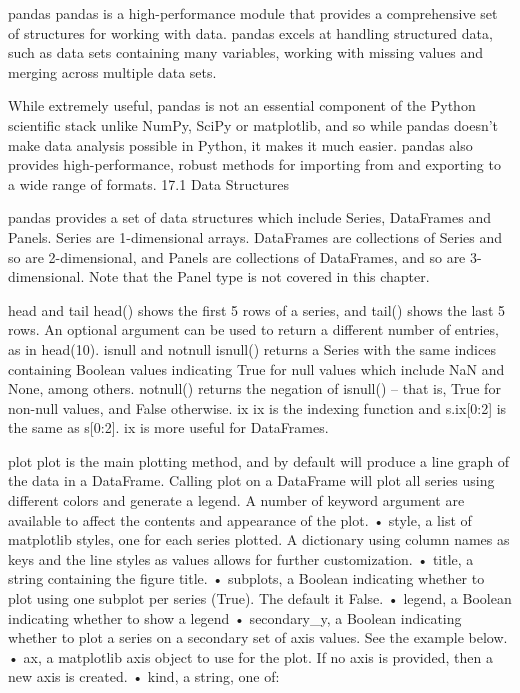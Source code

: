pandas
pandas is a high-performance module that provides a comprehensive set of structures for working with
data. pandas excels at handling structured data, such as data sets containing many variables, working with
missing values and merging across multiple data sets. 

While extremely useful, pandas is not an essential component of the Python scientific stack unlike NumPy, SciPy or matplotlib, and so while pandas doesn’t
make data analysis possible in Python, it makes it much easier. pandas also provides high-performance,
robust methods for importing from and exporting to a wide range of formats.
17.1 Data Structures

pandas provides a set of data structures which include Series, DataFrames and Panels. Series are 1-dimensional
arrays. DataFrames are collections of Series and so are 2-dimensional, and Panels are collections of DataFrames,
and so are 3-dimensional. Note that the Panel type is not covered in this chapter.

head and tail
head() shows the first 5 rows of a series, and tail() shows the last 5 rows. An optional argument can be
used to return a different number of entries, as in head(10).
isnull and notnull
isnull() returns a Series with the same indices containing Boolean values indicating True for null values
which include NaN and None, among others. notnull() returns the negation of isnull() – that is, True for
non-null values, and False otherwise.
ix
ix is the indexing function and s.ix[0:2] is the same as s[0:2]. ix is more useful for DataFrames.

plot
plot is the main plotting method, and by default will produce a line graph of the data in a DataFrame.
Calling plot on a DataFrame will plot all series using different colors and generate a legend. A number of
keyword argument are available to affect the contents and appearance of the plot.
• style, a list of matplotlib styles, one for each series plotted. A dictionary using column names as
keys and the line styles as values allows for further customization.
• title, a string containing the figure title.
• subplots, a Boolean indicating whether to plot using one subplot per series (True). The default it
False.
• legend, a Boolean indicating whether to show a legend
• secondary_y, a Boolean indicating whether to plot a series on a secondary set of axis values. See the
example below.
• ax, a matplotlib axis object to use for the plot. If no axis is provided, then a new axis is created.
• kind, a string, one of:

